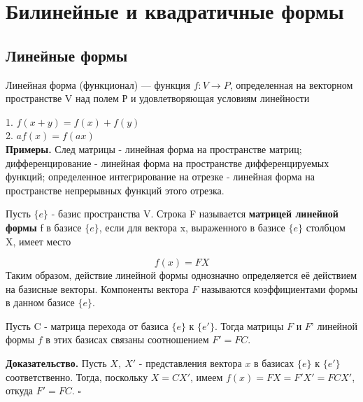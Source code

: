 \newpage
\section{Билинейные и квадратичные формы}
\subsection{Линейные формы}
\begin{defin}
Линейная форма (функционал) --- функция $f\colon V\to P$, определенная на
векторном пространстве V над полем Р и удовлетворяющая условиям линейности
\end{defin}
1. $f(x+y)=f(x)+f(y)$\\
2. $af(x)=f(ax)$\\
\textbf{Примеры.} След матрицы - линейная форма на пространстве матриц;
дифференцирование - линейная форма на пространстве дифференцируемых функций;
определенное интегрирование на отрезке - линейная форма на пространстве
непрерывных функций этого отрезка. 
\begin{defin}
Пусть $\{e\}$ - базис пространства V. Строка F называется \textbf{матрицей 
линейной формы} f в базисе $\{e\}$, если для вектора x, выраженного в базисе
$\{e\}$ столбцом X, имеет место
\end{defin}
$$f(x)=FX$$
Таким образом, действие линейной формы однозначно определяется её действием на
базисные векторы. Компоненты вектора $F$ называются коэффициентами формы в 
данном базисе $\{e\}$.
\begin{theor}
Пусть C - матрица перехода от базиса $\{e\}$ к $\{e'\}$. Тогда матрицы $F$ и 
$F’$ линейной формы $f$ в этих базисах связаны соотношением $F'=FC$.
\end{theor}
\textbf{Доказательство.} Пусть $X,~X'$ - представления вектора $x$ в базисах
$\{e\}$ к $\{e'\}$ соответственно. Тогда, поскольку $X=CX'$, имеем $f(x)=FX=F
'X'=FCX'$, откуда $F'=FC$. $\square$

